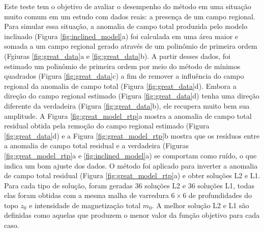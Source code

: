 Este teste tem o objetivo de avaliar o desempenho do método em uma situação muito comum em um estudo com dados reais: a presença de um campo regional.
Para simular essa situação, a anomalia de campo total produzida pelo modelo inclinado (Figura \ref{fig:inclined_model}a) foi calculada em uma área maior e somada a um campo regional gerado através de um polinômio de primeira ordem (Fgiuras \ref{fig:great_data}a e \ref{fig:great_data}b).
A partir desses dados, foi estimado um polinômio de primeira ordem por meio do método de mínimos quadrados (Figura \ref{fig:great_data}c) a fim de remover a influência do campo regional da anomalia de campo total (Figura \ref{fig:great_data}d).
Embora a direção do campo regional estimado (Figura \ref{fig:great_data}d) tenha uma direção diferente da verdadeira (Figura \ref{fig:great_data}b), ele recupera muito bem sua amplitude.
A Figura \ref{fig:great_model_rtp}a mostra a anomalia de campo total residual obtida pela remoção do campo regional estimado (Figura \ref{fig:great_data}d) e a Figura \ref{fig:great_model_rtp}b mostra que os resíduos entre a anomalia de campo total residual e a verdadeira (Figuras \ref{fig:great_model_rtp}a e \ref{fig:inclined_model}a) se comportam como ruído, o que indica um bom ajuste dos dados.
O método foi aplicado para inverter a anomalia de campo total residual (Figura \ref{fig:great_model_rtp}a) e obter soluções L2 e L1.
Para cada tipo de solução, foram geradas $36$ soluções L2 e $36$ soluções L1, 
todas elas foram obtidas com a mesma malha de varredura $6 \times 6$ de profundidades do topo $z_{0}$ e intensidade de magnetização total $m_{0}$.
A melhor solução L2 e L1 são definidas como aquelas que produzem o menor valor da função objetivo para cada caso.

